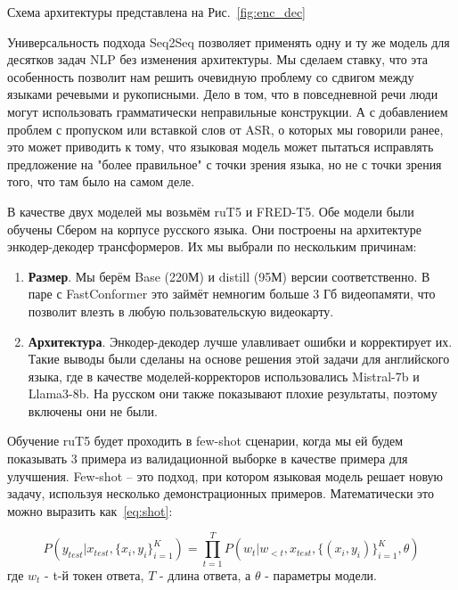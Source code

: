 Схема архитектуры представлена на Рис.~\ref{fig:enc_dec}

Универсальность подхода Seq2Seq позволяет применять одну и ту же модель для десятков задач NLP без изменения архитектуры.
Мы сделаем ставку, что эта особенность позволит нам решить очевидную проблему со сдвигом между языками речевыми и рукописными.
Дело в том, что в повседневной речи люди могут использовать грамматически неправильные конструкции.
А с добавлением проблем с пропуском или вставкой слов от ASR, о которых мы говорили ранее, это может приводить к тому, что языковая модель может пытаться исправлять предложение на "более правильное" с точки зрения языка, но не с точки зрения того, что там было на самом деле.

В качестве двух моделей мы возьмём ruT5 и FRED-T5.
Обе модели были обучены Сбером на корпусе русского языка.
Они построены на архитектуре энкодер-декодер трансформеров.
Их мы выбрали по нескольким причинам:

\begin{enumerate}
  \item \textbf{Размер}.
  Мы берём Base (220М) и distill (95М) версии соответственно. 
  В паре с FastConformer это займёт немногим больше 3 Гб видеопамяти, что позволит влезть в любую пользовательскую видеокарту.
  \item \textbf{Архитектура}.
  Энкодер-декодер лучше улавливает ошибки и корректирует их.
  Такие выводы были сделаны на основе решения этой задачи для английского языка, где в качестве моделей-корректоров использовались Mistral-7b и Llama3-8b.
  На русском они также показывают плохие результаты, поэтому включены они не были.
\end{enumerate}

Обучение ruT5 будет проходить в few-shot сценарии, когда мы ей будем показывать 3 примера из валидационной выборке в качестве примера для улучшения.
Few-shot -- это подход, при котором языковая модель решает новую задачу, используя несколько демонстрационных примеров.
Математически это можно выразить как~\ref{eq:shot}:

\begin{equation}
  P(y_{test}|x_{test},\{x_i,y_i\}^K_{i=1}) = \prod_{t=1}^{T}P(w_t|w_{<t},x_{test},\{(x_i,y_i)\}^K_{i=1},\theta)
  \label{eq:shot}
\end{equation}
где $w_t$ - t-й токен ответа, $T$ - длина ответа, а $\theta$ - параметры модели.

